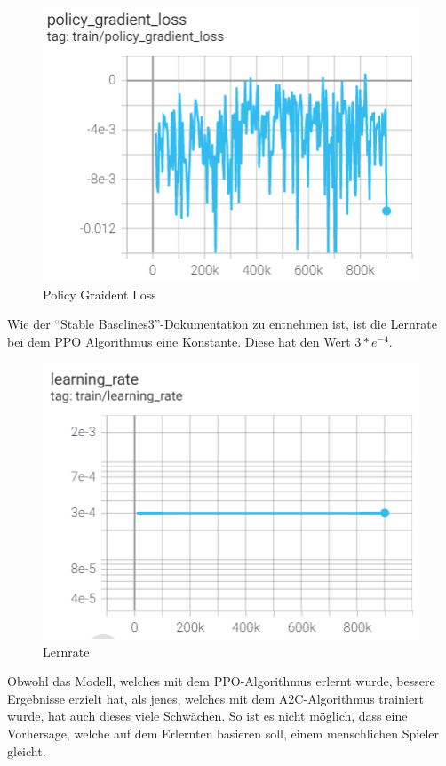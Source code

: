 \begin{figure}[H]
    \centering
    \includegraphics[scale=0.7]{pics/Tensorboard/PPO/policy_loss_new.png}
    \caption{Policy Graident Loss}
    \label{fig:ppo:pgl}
\end{figure}

Wie der ``Stable Baselines3''-Dokumentation %
zu entnehmen ist, ist die Lernrate bei dem PPO Algorithmus eine Konstante.
Diese hat den Wert \(3*e^{-4}\).

\begin{figure}[H]
    \centering
    \includegraphics[scale=0.7]{pics/Tensorboard/PPO/learning_rate_new.png}
    \caption{Lernrate}
    \label{fig:ppo:learningrate}
\end{figure}

Obwohl das Modell, welches mit dem PPO-Algorithmus erlernt wurde,
bessere Ergebnisse erzielt hat, als jenes, welches mit dem A2C-Algorithmus trainiert wurde,
hat auch dieses viele Schwächen. So ist es nicht möglich, dass eine Vorhersage, welche
auf dem Erlernten basieren soll, einem menschlichen Spieler gleicht.



